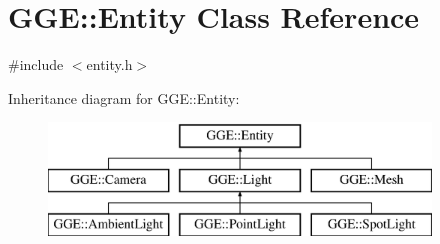 \hypertarget{class_g_g_e_1_1_entity}{\section{G\+G\+E\+:\+:Entity Class Reference}
\label{class_g_g_e_1_1_entity}
}


{\ttfamily \#include $<$entity.\+h$>$}

Inheritance diagram for G\+G\+E\+:\+:Entity\+:\begin{figure}[H]
\begin{center}
\leavevmode
\includegraphics[height=3.000000cm]{class_g_g_e_1_1_entity}
\end{center}
\end{figure}
